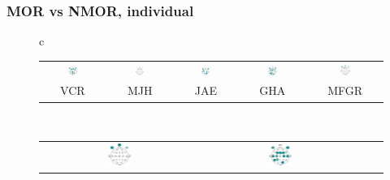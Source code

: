 \documentclass{beamer}
\begin{document}
\begin{frame}\frametitle{MOR vs NMOR, individual}
\begin{figure}
\centering
\begin{tabular}{c}
\begin{tabular}{ccccc}
\includegraphics[width=0.15\textwidth]{./img_diagramas/cabecita_VCR.pdf} &
\includegraphics[width=0.15\textwidth]{./img_diagramas/cabecita_MJH.pdf} &
\includegraphics[width=0.15\textwidth]{./img_diagramas/cabecita_JAE.pdf} &
\includegraphics[width=0.15\textwidth]{./img_diagramas/cabecita_GHA.pdf} &
\includegraphics[width=0.15\textwidth]{./img_diagramas/cabecita_MFGR.pdf} \\
VCR & MJH & JAE & GHA & MFGR
\end{tabular}
\\
\begin{tabular}{cccc}
\includegraphics[width=0.15\textwidth]{./img_diagramas/cabecita_CLO.pdf} &
\includegraphics[width=0.15\textwidth]{./img_diagramas/cabecita_RLO.pdf} &

\end{tabular}
\end{tabular}
\end{figure}
\end{frame}
\end{document}
